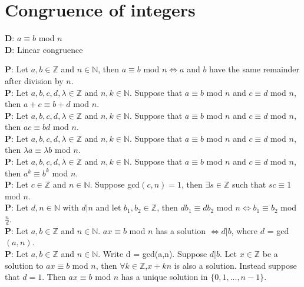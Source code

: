 \documentclass[a4paper]{article}
\begin{document}
\section*{Congruence of integers}
\begin{multicols}{3}
	\noindent
	\textbf{D}: $a \equiv b$ mod $n$\\
	\textbf{D}: Linear congruence\\
\end{multicols}
	\noindent
	\textbf{P}: Let $a,b \in \mathbb{Z}$ and $n\in \mathbb{N}$, then $a \equiv b$ mod $n \Leftrightarrow a $ and $b$ have the same remainder after division by $n$.\\
	\textbf{P}: Let $a,b,c,d,\lambda \in \mathbb{Z}$ and $n,k \in \mathbb{N}$. Suppose that $a \equiv b$ mod $n$ and $c \equiv d$ mod $n$, then $a+c\equiv b+d$ mod $n$.\\
	\textbf{P}: Let $a,b,c,d,\lambda \in \mathbb{Z}$ and $n,k \in \mathbb{N}$. Suppose that $a \equiv b$ mod $n$ and $c \equiv d$ mod $n$, then $ac\equiv bd$ mod $n$.\\
	\textbf{P}: Let $a,b,c,d,\lambda \in \mathbb{Z}$ and $n,k \in \mathbb{N}$. Suppose that $a \equiv b$ mod $n$ and $c \equiv d$ mod $n$, then $\lambda a\equiv \lambda b$ mod $n$.\\
	\textbf{P}: Let $a,b,c,d,\lambda \in \mathbb{Z}$ and $n,k \in \mathbb{N}$. Suppose that $a \equiv b$ mod $n$ and $c \equiv d$ mod $n$, then $a^k \equiv b^k$ mod $n$.\\
	\textbf{P}: Let $c\in \mathbb{Z}$ and $n\in \mathbb{N}$. Suppose gcd$(c,n)=1$, then $\exists s \in \mathbb{Z}$ such that $sc\equiv 1$ mod $n$.\\
	\textbf{P}: Let $d,n \in \mathbb{N}$ with $d\vert n$ and let $b_1,b_2 \in \mathbb{Z}$, then $db_1 \equiv db_2$ mod $n \Leftrightarrow b_1 \equiv b_2$ mod $\frac{n}{d}$.\\
	\textbf{P}: Let $a,b \in \mathbb{Z}$ and $n\in \mathbb{N}$. $ax \equiv b$ mod $n$ has a solution $\Leftrightarrow d\vert b$, where $d$ = gcd$(a, n)$.\\
	\textbf{P}: Let $a,b \in \mathbb{Z}$ and $n \in \mathbb{N}$. Write d = gcd(a,n). Suppose $d\vert b$. Let $x \in \mathbb{Z}$ be a solution to $ax\equiv b$ mod $n$, then $\forall k \in \mathbb{Z}$,$x+kn$ is also a solution. Instead suppose that $d = 1$. Then $ax\equiv b$ mod $n$ has a unique solution in $\{0,1,...,n - 1\}$.
	
\end{document}
